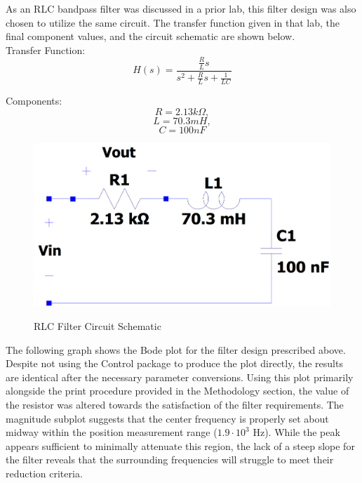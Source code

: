 \documentclass[12pt]{report}
\begin{document}
As an RLC bandpass filter was discussed in a prior lab, this filter design was also chosen to utilize the same circuit. The transfer function given in that lab, the final component values, and the circuit schematic are shown below. \\

Transfer Function:
\begin{equation*}
	H(s) = \frac{\frac{R}{L}s}{s^2+\frac{R}{L}s+\frac{1}{LC}}
\end{equation*}

Components:
$$ R = 2.13 k\Omega, $$
$$ L = 70.3 mH, $$
$$ C = 100 nF $$

\begin{figure}[h]
	\begin{center}
		\includegraphics[scale = 0.5]{Lab 12 - Schematic/RLC Schematic.png}\\[0.01 cm]
		\caption*{\small RLC Filter Circuit Schematic}
	\end{center}
\end{figure}

The following graph shows the Bode plot for the filter design prescribed above. Despite not using the Control package to produce the plot directly, the results are identical after the necessary parameter conversions. Using this plot primarily alongside the print procedure provided in the Methodology section, the value of the resistor was altered towards the satisfaction of the filter requirements. The magnitude subplot suggests that the center frequency is properly set about midway within the position measurement range ($ 1.9\cdot10^3 $ Hz). While the peak appears sufficient to minimally attenuate this region, the lack of a steep slope for the filter reveals that the surrounding frequencies will struggle to meet their reduction criteria. \\
\end{document}
